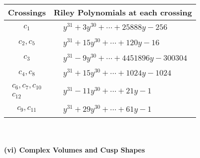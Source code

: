 \documentclass[1p]{elsarticle_modified}
\theoremstyle{definition}
\begin{document}
\begin{tabular}{m{50pt}|m{274pt}}
Crossings & \hspace{64pt}Riley Polynomials at each crossing \\
\hline $$\begin{aligned}c_{1}\end{aligned}$$&$\begin{aligned}
&y^{31}+3 y^{30}+\cdots+25888 y-256
\end{aligned}$\\
\hline $$\begin{aligned}c_{2},c_{5}\end{aligned}$$&$\begin{aligned}
&y^{31}+15 y^{30}+\cdots+120 y-16
\end{aligned}$\\
\hline $$\begin{aligned}c_{3}\end{aligned}$$&$\begin{aligned}
&y^{31}-9 y^{30}+\cdots+4451896 y-300304
\end{aligned}$\\
\hline $$\begin{aligned}c_{4},c_{8}\end{aligned}$$&$\begin{aligned}
&y^{31}+15 y^{30}+\cdots+1024 y-1024
\end{aligned}$\\
\hline $$\begin{aligned}c_{6},c_{7},c_{10}\\c_{12}\end{aligned}$$&$\begin{aligned}
&y^{31}-11 y^{30}+\cdots+21 y-1
\end{aligned}$\\
\hline $$\begin{aligned}c_{9},c_{11}\end{aligned}$$&$\begin{aligned}
&y^{31}+29 y^{30}+\cdots+61 y-1
\end{aligned}$\\
\hline
\end{tabular}\\~\\
\newpage\flushleft \textbf{(vi) Complex Volumes and Cusp Shapes}
\end{document}

